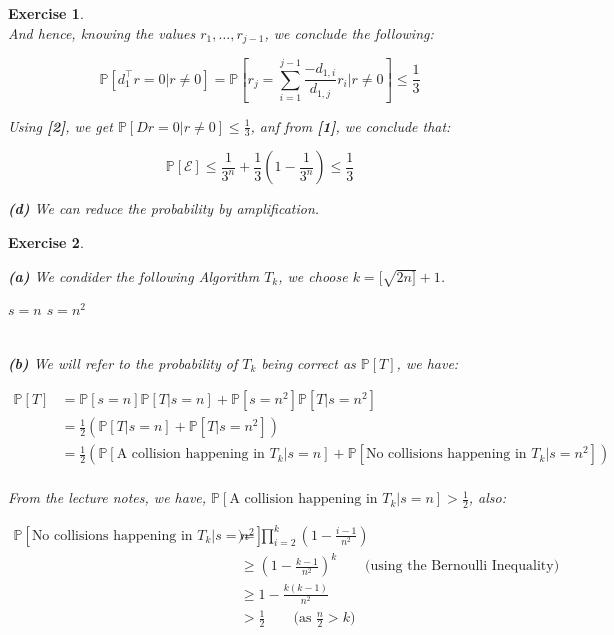 \documentclass{article}
\newtheorem{exo}{Exercise}
\def\P{\mathbb{P}}
\begin{document}
\begin{exo}{\ \\}
And hence, knowing the values $r_1, \dots, r_{j-1}$, we conclude the following:


\[
\P[d_1^\top r = 0 | r\neq0]
= \P\left[r_j = \sum^{j-1}_{i=1} \frac{-d_{1,i}}{d_{1,j}} r_i |r\neq0\right] \leq \frac{1}{3} 
\]

Using \textbf{[2]}, we get $\P[D r = 0 | r\neq0] \leq \frac{1}{3}$, anf from \textbf{[1]}, we conclude that:

\[
\P[\mathcal{E}] \leq \frac{1}{3^n} + \frac{1}{3}(1- \frac{1}{3^n} ) \leq \frac{1}{3} 
\]

\noindent
\textbf{(d)} We can reduce the probability by amplification.

\end{exo}

\begin{exo}{\ \\}


\noindent 
\textbf{(a)} We condider the following Algorithm $T_k$, we choose $k = [\sqrt{2n]} + 1$. \\



\begin{algorithmic}[1]
\State {}
    \State \Return $s=n$
\EndIf
\State \Return $s = n^2$
\end{algorithmic}

\noindent
\\\textbf{(b)} We will refer to the probability of $T_k$ being correct as $\P[T]$, we have: 

\begin{align*}
    \P[T] 
    &= \P[s=n]\P[T|s=n] + \P[s=n^2]\P[T|s=n^2] \\
    &= \frac{1}{2} (\P[T|s=n] + \P[T|s=n^2]) \\
    &= \frac{1}{2} (\P[\text{A collision happening in $T_k$}|s=n] 
    + \P[\text{No collisions happening in $T_k$}|s=n^2]) \\
\end{align*}

From the lecture notes, we have, $\P[\text{A collision happening in $T_k$}|s=n] > \frac{1}{2}$, also:

\begin{align*}
    \P[\text{No collisions happening in $T_k$}|s=n^2]) 
    &= \prod_{i=2}^{k} (1-\frac{i-1}{n^2})  \\
    &\geq (1-\frac{k-1}{n^2})^k 
    \quad \quad \text{(using the Bernoulli Inequality)}\\
    &\geq 1 - \frac{k(k-1)}{n^2} \\
    &> \frac{1}{2}
    \quad \quad \text{(as $\frac{n}{2} > k)$}\\
\end{align*}

\newpage
\end{exo}
\end{document}
